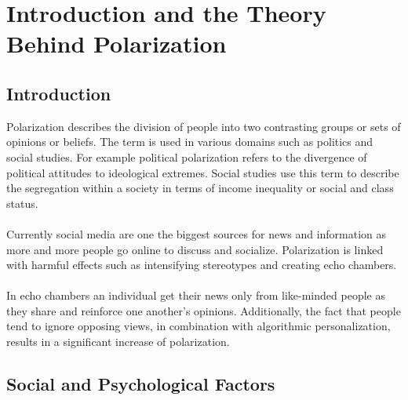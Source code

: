 \chapter{Introduction and the Theory Behind Polarization}
\label{ch:Introduction}


\section{Introduction}
\label{sec:Objectives}

Polarization describes the division of people into two contrasting groups or sets of opinions or beliefs. The term is used in various domains such as politics and social studies. For example political polarization refers to the divergence of political attitudes to ideological extremes. Social studies use this term to  describe the segregation within a society in terms of income inequality or social and class status.
\\
\\
Currently social media are one the biggest sources for news and information as more and more people go online to discuss and socialize. Polarization is linked with harmful effects such as intensifying stereotypes and creating echo chambers.
\\
\\
In echo chambers an individual get their news only from like-minded people as they share and reinforce one another’s opinions. Additionally, the fact that people tend to ignore opposing views, in combination with algorithmic personalization, results in a significant increase of polarization.

\section{Social and Psychological Factors}

